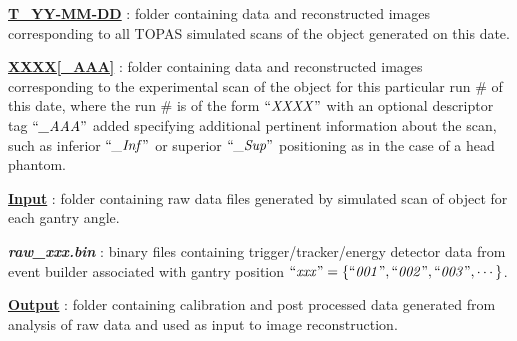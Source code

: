 \documentclass[landscape]{article}
\begin{document}
\begin{myEnumerate}[labelindent=0pt, leftmargin=*]
\begin{myEnumerate}[labelindent=1pt, leftmargin=*]
\begin{myEnumerate}[labelindent=1pt, leftmargin=*]
\begin{myEnumerate}[labelindent=1pt, leftmargin=*]
\begin{myEnumerate}[labelindent=1pt, leftmargin=*]
\begin{myEnumerate}[labelindent=1pt, leftmargin=*]
\begin{myEnumerate}[labelindent=1pt, leftmargin=*]
\begin{myEnumerate}[labelindent=1pt, leftmargin=*]
\begin{myEnumerate}[labelindent=1pt, leftmargin=*]
\begin{myEnumerate}[labelindent=1pt, leftmargin=*]
                                    \end{myEnumerate}
                                \end{myEnumerate}
                            \end{myEnumerate}
                        \end{myEnumerate}
                    \end{myEnumerate}
                \end{myEnumerate}
            \end{myEnumerate}
            \item \ul{\textbf{T\_YY-MM-DD}} : folder containing data and reconstructed images corresponding to all TOPAS simulated scans of the object generated on this date.
            \begin{myEnumerate}[labelindent=1pt, leftmargin=*]
                \item \ul{\textbf{XXXX[\_AAA]}} : folder containing data and reconstructed images corresponding to the experimental scan of the object for this particular run \# of this date, where the run \# is of the form $\textrm{``\textit{XXXX}''}$ with an optional descriptor tag $\textrm{``\textit{\_AAA}''}$ added specifying additional pertinent information about the scan, such as inferior $\textrm{``\textit{\_Inf}''}$ or superior $\textrm{``\textit{\_Sup}''}$ positioning as in the case of a head phantom.
                \begin{myEnumerate}[labelindent=1pt, leftmargin=*]
                    \item \ul{\textbf{Input}} : folder containing raw data files generated by simulated scan of object for each gantry angle.
                    \begin{myEnumerate}[labelindent=1pt, leftmargin=*]
                        \item \textbf{\textit{raw\_xxx.bin}} : binary files containing trigger/tracker/energy detector data from event builder associated with gantry position $\textrm{``\textit{xxx}''} =\{\textrm{``\textit{001}''}, \textrm{``\textit{002}''}, \textrm{``\textit{003}''}, \cdots\}$.
                    \end{myEnumerate}
                    \item \ul{\textbf{Output}} : folder containing calibration and post processed data generated from analysis of raw data and used as input to image reconstruction.
                    \begin{myEnumerate}[labelindent=1pt, leftmargin=*]

\end{myEnumerate}
\end{myEnumerate}
\end{myEnumerate}
\end{myEnumerate}
\end{myEnumerate}
\end{myEnumerate}
\end{document}
